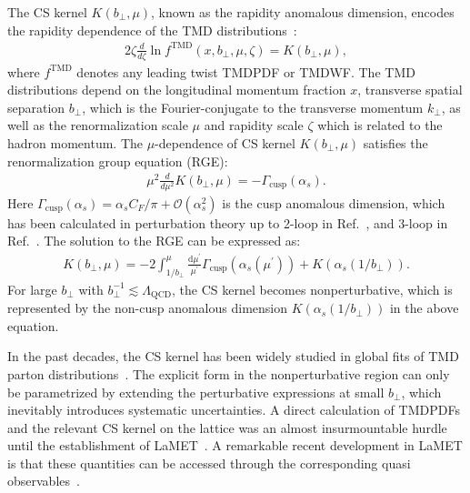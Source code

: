 The CS kernel $K\left(b_{\perp}, \mu\right)$, known as the rapidity anomalous dimension, encodes the rapidity dependence  of the TMD distributions~\cite{Collins:1981va,Collins:1981uk}:
\begin{align}
	2 \zeta \frac{d}{d \zeta} \ln f^{\mathrm{TMD}}\left(x, b_{\perp}, \mu, \zeta\right)=K\left(b_{\perp}, \mu\right), \label{eq:TMDsrapidityevolution}
\end{align}
where $f^{\mathrm{TMD}}$ denotes any leading twist TMDPDF or TMDWF. The TMD distributions depend on the longitudinal momentum fraction $x$, transverse spatial separation $b_{\perp}$, which is the Fourier-conjugate to the transverse momentum $k_{\perp}$, as well as the renormalization scale $\mu$ and rapidity scale $\zeta$ {which is related to the hadron momentum}. The $\mu$-dependence of CS kernel $K\left(b_{\perp}, \mu\right)$ satisfies the   renormalization group equation (RGE):
\begin{align}
	\mu^{2} \frac{d}{d \mu^{2}} K\left(b_{\perp}, \mu\right)=-\Gamma_{\text {cusp}}\left(\alpha_{s}\right).  \label{eq:cuspanomalousdimension}
\end{align}
Here $\Gamma_{\text {cusp}}\left(\alpha_{s}\right)=\alpha_sC_F/\pi+\mathcal{O}(\alpha_s^2)$ is the cusp anomalous dimension, which has been calculated  in  perturbation theory  up to 2-loop in Ref.~\cite{Li:2016ctv}, and 3-loop in Ref.~\cite{Moch:2017uml}. The solution to  the RGE  can be expressed as: 
\begin{align}
	K\left(b_{\perp}, \mu\right)=-2 \int_{1 / b_{\perp}}^{\mu} \frac{\mathrm{d} \mu^{\prime}}{\mu^{\prime}} \Gamma_{\text {cusp}}\left(\alpha_{s}\left(\mu^{\prime}\right)\right)+K\left(\alpha_{s}\left(1 / b_{\perp}\right)\right). 
	\label{eq:nonper-per-CS-kernel}
\end{align} 
For large $b_{\perp}$ with $b_{\perp}^{-1}\lesssim\Lambda_{\mathrm{QCD}}$, the CS kernel becomes nonperturbative, which is  represented by the non-cusp anomalous dimension $K\left(\alpha_{s}\left(1/b_{\perp}\right)\right)$ in the above equation. 

In the past decades, the CS kernel has  been widely studied in global fits of  TMD parton distributions~\cite{Landry:1999an,Landry:2002ix,DAlesio:2014mrz,Sun:2014dqm,Konychev:2005iy,Bacchetta:2017gcc,Scimemi:2017etj,Scimemi:2019cmh,Bacchetta:2019sam}. The explicit form in the nonperturbative region can only be parametrized by extending the perturbative expressions at  small $b_{\perp}$, which inevitably introduces systematic uncertainties. A direct calculation of TMDPDFs and the relevant CS kernel 
on the lattice was an almost insurmountable hurdle until the establishment  of LaMET~\cite{Ji:2013dva,Ji:2014gla}.  A remarkable recent development in LaMET is that  these quantities  can  be accessed through the corresponding quasi observables~\cite{Ebert:2019okf,Ji:2019sxk,Ji:2019ewn,Ji:2021znw}.

